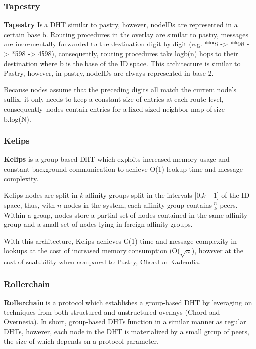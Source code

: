 \subsubsection*{Tapestry}

\textbf{Tapestry} \cite{tapestry} Is a DHT similar to pastry, however, nodeIDs are represented in a certain base b. Routing procedures in the overlay are similar to pastry, messages are incrementally forwarded to the destination digit by digit (e.g. ***8 -> **98 -> *598 -> 4598), consequently, routing procedures take logb(n) hops to their destination where b is the base of the ID space. This architecture is similar to Pastry, however, in pastry, nodeIDs are always represented in base 2.

Because nodes assume that the preceding digits all match the current node's suffix, it only needs to keep a constant size of entries at each route level, consequently, nodes contain entries for a fixed-sized neighbor map of size b.log(N).  

\subsubsection*{Kelips}

\textbf{Kelips} \cite{gupta2003kelips} is a group-based DHT which exploits increased memory usage and constant background communication to achieve O(1) lookup time and message complexity. 

Kelips nodes are split in $k$ affinity groups split in the intervals [0,$k-1$] of the ID space, thus, with $n$ nodes in the system, each affinity group contains $\frac{n}{k}$ peers. Within a group, nodes store a partial set of nodes contained in the same affinity group and a small set of nodes lying in foreign affinity groups.

With this architecture, Kelips achieves O(1) time and message complexity in lookups at the cost of increased memory consumption (O($\sqrt{n}$), however at the cost of scalability when compared to Pastry, Chord or Kademlia. 

\subsubsection*{Rollerchain}

\textbf{Rollerchain} \cite{rollerchain} is a protocol which establishes a group-based DHT by leveraging on techniques from both structured and unstructured  overlays (Chord and Overnesia). In short, group-based DHTs function in a similar manner as regular DHTs, however, each node in the DHT is materialized by a small group of peers,
the size of which depends on a protocol parameter. 

